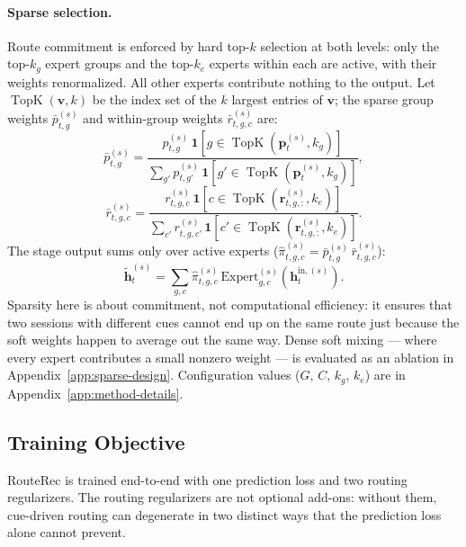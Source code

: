 \documentclass[sigconf,review,anonymous]{acmart}
\begin{document}
\paragraph{Sparse selection.}
Route commitment is enforced by hard top-$k$ selection at both levels: only the top-$k_g$ expert groups and the top-$k_e$ experts within each are active, with their weights renormalized. All other experts contribute nothing to the output. Let $\operatorname{TopK}(\mathbf{v},k)$ be the index set of the $k$ largest entries of $\mathbf{v}$; the sparse group weights $\bar{p}^{(s)}_{t,g}$ and within-group weights $\bar{r}^{(s)}_{t,g,c}$ are:
\begin{equation}
\bar{p}^{(s)}_{t,g} = \frac{p^{(s)}_{t,g}\,\mathbf{1}[g\in \operatorname{TopK}(\mathbf{p}^{(s)}_t,k_g)]}{\sum_{g'} p^{(s)}_{t,g'}\,\mathbf{1}[g'\in \operatorname{TopK}(\mathbf{p}^{(s)}_t,k_g)]},
\label{eq:sparse-route}
\end{equation}
\begin{equation}
\bar{r}^{(s)}_{t,g,c} = \frac{r^{(s)}_{t,g,c}\,\mathbf{1}[c\in \operatorname{TopK}(\mathbf{r}^{(s)}_{t,g,:},k_e)]}{\sum_{c'} r^{(s)}_{t,g,c'}\,\mathbf{1}[c'\in \operatorname{TopK}(\mathbf{r}^{(s)}_{t,g,:},k_e)]}.
\label{eq:sparse-within-group}
\end{equation}
The stage output sums only over active experts ($\hat{\pi}^{(s)}_{t,g,c} = \bar{p}^{(s)}_{t,g}\,\bar{r}^{(s)}_{t,g,c}$):
\begin{equation}
\tilde{\mathbf{h}}^{(s)}_t = \sum_{g,c}\hat{\pi}^{(s)}_{t,g,c}\,\mathrm{Expert}^{(s)}_{g,c}(\mathbf{h}^{\mathrm{in},(s)}_t).
\label{eq:sparse-stage-routing}
\end{equation}
Sparsity here is about commitment, not computational efficiency: it ensures that two sessions with different cues cannot end up on the same route just because the soft weights happen to average out the same way. Dense soft mixing --- where every expert contributes a small nonzero weight --- is evaluated as an ablation in Appendix~\ref{app:sparse-design}. Configuration values ($G$, $C$, $k_g$, $k_e$) are in Appendix~\ref{app:method-details}.


\subsection{Training Objective}
\label{sec:training-objective}

RouteRec is trained end-to-end with one prediction loss and two routing regularizers. The routing regularizers are not optional add-ons: without them, cue-driven routing can degenerate in two distinct ways that the prediction loss alone cannot prevent.
\end{document}
